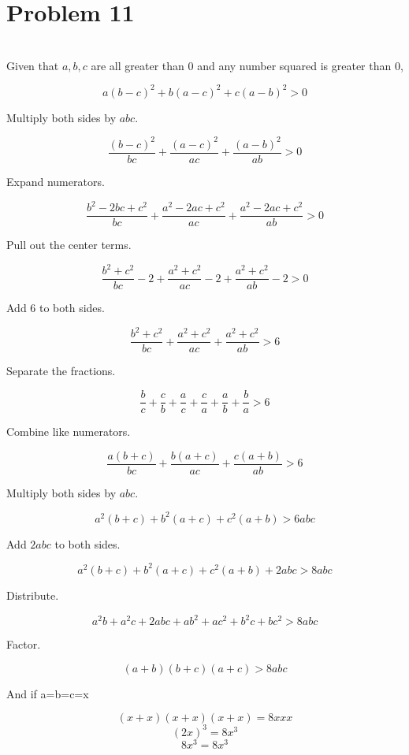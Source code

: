 \documentclass[12pt]{article}
\begin{document}
\newpage
\section*{Problem 11}
\\

Given that $a,b,c$ are all greater than 0 and any number squared is greater than 0,

\[a(b-c)^2 + b(a-c)^2 + c(a-b)^2 > 0\]

Multiply both sides by $abc$.

\[\frac{(b-c)^2}{bc} + \frac{(a-c)^2}{ac} + \frac{(a-b)^2}{ab} > 0\]

Expand numerators.

\[\frac{b^2 - 2bc +c^2}{bc} + \frac{a^2 -2ac +c^2}{ac} + \frac{a^2 - 2ac + c^2}{ab} > 0\]

Pull out the center terms.

\[\frac{b^2+c^2}{bc} - 2  + \frac{a^2+c^2}{ac} - 2 + \frac{a^2 + c^2}{ab} - 2 > 0\]

Add 6 to both sides.

\[\frac{b^2+c^2}{bc} + \frac{a^2+c^2}{ac} + \frac{a^2 + c^2}{ab} > 6\]

Separate the fractions.

\[\frac{b}{c} + \frac{c}{b} + \frac{a}{c} + \frac{c}{a} + \frac{a}{b} + \frac{b}{a} > 6\]

Combine like numerators.

\[\frac{a(b+c)}{bc} + \frac{b(a+c)}{ac} + \frac{c(a+b)}{ab} > 6\]

Multiply both sides by $abc$.

\[a^2(b+c) + b^2(a+c) + c^2(a+b) > 6abc\]

Add $2abc$ to both sides.

\[a^2(b+c) + b^2(a+c) + c^2(a+b) +2abc > 8abc\]

Distribute.

\[a^2b + a^2c + 2abc + ab^2 + ac^2 + b^2c + bc^2 > 8abc\]

Factor.

\[(a+b)(b+c)(a+c) > 8abc\]

And if a=b=c=x

\[(x+x)(x+x)(x+x) = 8xxx\]
\[(2x)^3 = 8x^3\]
\[8x^3 = 8x^3\]
\end{document}
